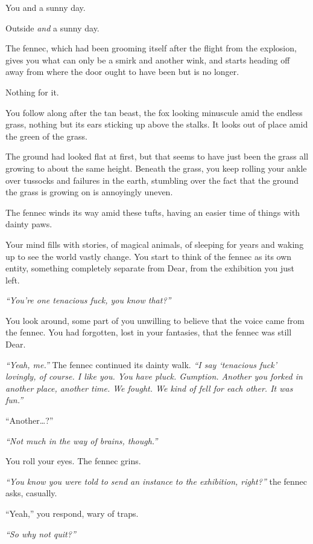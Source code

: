 \newpage

You and a sunny day.

Outside \emph{and} a sunny day.

The fennec, which had been grooming itself after the flight from the explosion, gives you what can only be a smirk and another wink, and starts heading off away from where the door ought to have been but is no longer.

Nothing for it.

You follow along after the tan beast, the fox looking minuscule amid the endless grass, nothing but its ears sticking up above the stalks. It looks out of place amid the green of the grass.

The ground had looked flat at first, but that seems to have just been the grass all growing to about the same height. Beneath the grass, you keep rolling your ankle over tussocks and failures in the earth, stumbling over the fact that the ground the grass is growing on is annoyingly uneven.

The fennec winds its way amid these tufts, having an easier time of things with dainty paws.

Your mind fills with stories, of magical animals, of sleeping for years and waking up to see the world vastly change. You start to think of the fennec as its own entity, something completely separate from Dear, from the exhibition you just left.

\emph{``You're one tenacious fuck, you know that?''}

You look around, some part of you unwilling to believe that the voice came from the fennec. You had forgotten, lost in your fantasies, that the fennec was still Dear.

\emph{``Yeah, me.''} The fennec continued its dainty walk. \emph{``I say `tenacious fuck' lovingly, of course. I like you. You have pluck. Gumption. Another you forked in another place, another time. We fought. We kind of fell for each other. It was fun.''}

``Another\ldots{}?''

\emph{``Not much in the way of brains, though.''}

You roll your eyes. The fennec grins.

\emph{``You know you were told to send an instance to the exhibition, right?''} the fennec asks, casually.

``Yeah,'' you respond, wary of traps.

\emph{``So why not quit?''}

